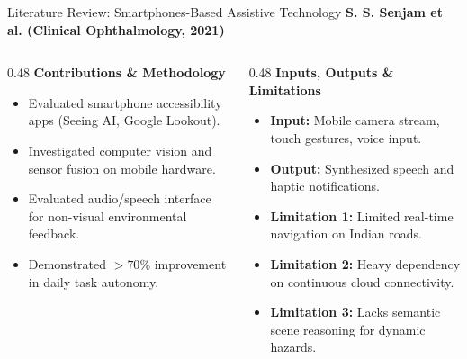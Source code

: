 \begin{frame}{Literature Review: Smartphones-Based Assistive Technology}
{\large\textbf{\textcolor{MyUnivGreen}{S. S. Senjam et al. (Clinical Ophthalmology, 2021) \cite{senjam2021smartphones}}}}\\[6pt]

\begin{columns}[T]
  \begin{column}{0.48\textwidth}
    \textbf{\textcolor{MyUnivGreen}{Contributions \& Methodology}}\\[4pt]
    \begin{itemize}
      \item Evaluated smartphone accessibility apps (Seeing AI, Google Lookout).
      \item Investigated computer vision and sensor fusion on mobile hardware.
      \item Evaluated audio/speech interface for non-visual environmental feedback.
      \item Demonstrated $>70\%$ improvement in daily task autonomy.
    \end{itemize}
  \end{column}
  
  \begin{column}{0.48\textwidth}
    \textbf{\textcolor{MyUnivGreen}{Inputs, Outputs \& Limitations}}\\[4pt]
    \begin{itemize}
      \item \textbf{Input:} Mobile camera stream, touch gestures, voice input.
      \item \textbf{Output:} Synthesized speech and haptic notifications.
      \item \textbf{Limitation 1:} Limited real-time navigation on Indian roads.
      \item \textbf{Limitation 2:} Heavy dependency on continuous cloud connectivity.
      \item \textbf{Limitation 3:} Lacks semantic scene reasoning for dynamic hazards.
    \end{itemize}
  \end{column}
\end{columns}
\end{frame}

